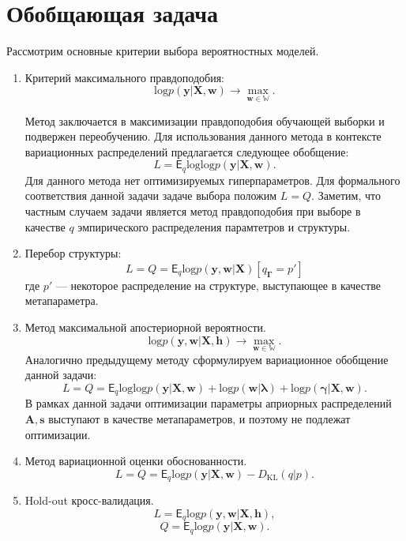 \section{Обобщающая задача}
Рассмотрим основные критерии выбора вероятностных моделей.

\begin{enumerate}
\item Критерий максимального правдоподобия:
\[
    \text{log}p(\mathbf{y}|\mathbf{X}, \mathbf{w}) \to \max_{\mathbf{w} \in \mathbb{W}}.
\]

Метод заключается в максимизации правдоподобия обучающей выборки и подвержен переобучению.
Для использования данного метода в контексте вариационных распределений предлагается следующее обобщение:
\[
    L =  \mathsf{E}_q \text{log} \text{log}p(\mathbf{y}|\mathbf{X}, \mathbf{w}).
\]
Для данного метода нет оптимизируемых гиперпараметров. Для формального соответствия данной задачи задаче выбора положим $L=Q$.
Заметим, что частным случаем задачи является метод правдоподобия при выборе в качестве $q$ эмпирического распределения парамтетров и структуры.

\item Перебор структуры:
\[
    L =  Q = \mathsf{E}_q\text{log}p(\mathbf{y}, \mathbf{w}|\mathbf{X})[q_{\boldsymbol{\Gamma}} = p']
\]
где $p'$ --- некоторое распределение на структуре, выступающее в качестве метапараметра.


\item Метод максимальной апостериорной вероятности. 
\[
    \text{log}p(\mathbf{y},\mathbf{w}|\mathbf{X}, \mathbf{h} ) \to \max_{\mathbf{w} \in \mathbb{W}}.
\]
Аналогично предыдущему методу сформулируем вариационное обобщение данной задачи:
\[
    L = Q = \mathsf{E}_q \text{log} \text{log}p(\mathbf{y}|\mathbf{X}, \mathbf{w})+\text{log}p(\mathbf{w}|\boldsymbol{\lambda}) + \text{log}p(\boldsymbol{\gamma}|\mathbf{X}, \mathbf{w}).
\]
В рамках данной задачи оптимизации параметры априорных распределений $\mathbf{A}, \mathbf{s}$ выступают в качестве метапараметров, и поэтому не подлежат оптимизации.



\item Метод вариационной оценки обоснованности.
\[
    L = Q = \mathsf{E}_q \text{log}p(\mathbf{y}|\mathbf{X}, \mathbf{w}) - D_\text{KL}(q|p).
\]





\item Hold-out кросс-валидация.
\[
    L = \mathsf{E}_q \text{log}p(\mathbf{y}, \mathbf{w}|\mathbf{X}, \mathbf{h}),
\]
\[
    Q = \mathsf{E}_q \text{log}p(\mathbf{y}|\mathbf{X}, \mathbf{w}).
\]



\end{enumerate}
